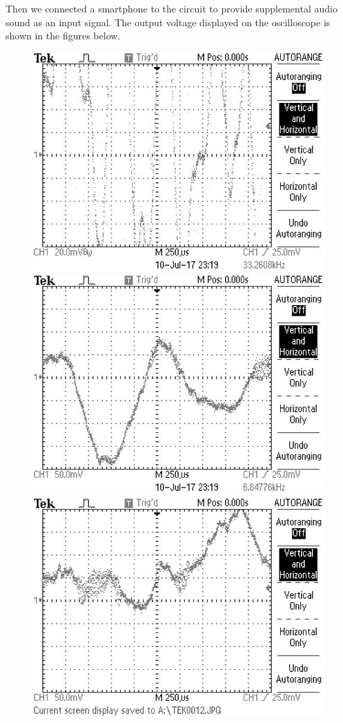 \phantom{ } Then we connected a smartphone to the circuit to provide supplemental audio sound as an input signal. The output voltage displayed on the oscilloscope is shown in the figures below.
\begin{figure}[!htbp]
	\centering 
	\begin{framed}
		\includegraphics[width=\linewidth]{images/TEK0011.jpg}
		\includegraphics[width=\linewidth]{images/TEK0012.jpg} 
		\includegraphics[width=\linewidth]{images/TEK0013.jpg}  

\end{framed}
\end{figure}

